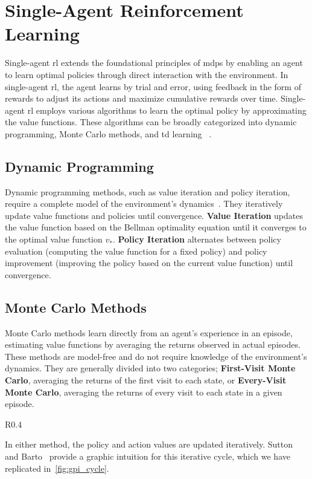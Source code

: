 \section{Single-Agent Reinforcement Learning}%

Single-agent \gls{rl} extends the foundational principles of \glspl{mdp} 
by enabling an agent to learn optimal policies through direct interaction with 
the environment. In single-agent \gls{rl}, the agent learns by trial and error, 
using feedback in the form of rewards to adjust its actions and maximize 
cumulative rewards over time.
Single-agent \gls{rl} employs various algorithms to learn the optimal policy by 
approximating the value functions. These algorithms can be broadly categorized 
into dynamic programming, Monte Carlo methods, and \gls{td} learning~%
\cite{sutton2018}.

    \subsection*{Dynamic Programming}%

Dynamic programming methods, such as value iteration and policy iteration, 
require a complete model of the environment's dynamics~\cite{sutton2018}.
They iteratively update value functions and policies until convergence. 
\textbf{Value Iteration} updates the value function based on the Bellman 
optimality equation until it converges to the optimal value function \(v_*\).
\textbf{Policy Iteration} alternates between policy evaluation 
(computing the value function for a fixed policy) and policy improvement 
(improving the policy based on the current value function) until convergence.

    \subsection*{Monte Carlo Methods}%

Monte Carlo methods learn directly from an agent's experience in an episode, 
estimating value functions by averaging the returns observed in actual episodes.
These methods are model-free and do not require knowledge of the environment's 
dynamics. They are generally divided into two categories; 
\textbf{First-Visit Monte Carlo}, averaging the returns of the first visit to 
each state, or \textbf{Every-Visit Monte Carlo}, averaging the returns of every
visit to each state in a given episode.
%
\begin{wrapfigure}[7]{R}{0.4\textwidth}
    \vspace*{-3em}
    \centering
    \resizebox{0.3\textwidth}{!}{%
        
    }
    \captionsetup{margin=1.2em}
    \caption{Generalized Policy Iteration.}
    \label{fig:gpi_cycle}
\end{wrapfigure}
%
In either method, the policy and action values are updated iteratively.
Sutton and Barto~\cite{sutton2018} provide a graphic intuition for this 
iterative cycle, which we have replicated in~\cref{fig:gpi_cycle}.

